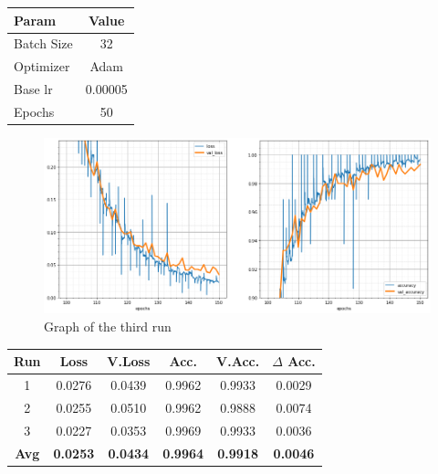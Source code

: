 \begin{table}[H]
	\centering
	\begin{tabular}{lc}
	\textbf{Param} & \textbf{Value}\\ \hline
	Batch Size 	& 32 \\
	Optimizer 	& Adam \\
	Base lr		& 0.00005 \\
	Epochs		& 50 \\
	\end{tabular}
\end{table}


\begin{figure}[H]
	\begin{center}
	\includegraphics[width=\linewidth]{Immagini/bn}
	\caption{Graph of the third run}
	\end{center}
\end{figure}
\begin{table}[H]
	\centering
	\begin{tabular}{cccccc}
		\textbf{Run} &\textbf{Loss}&\textbf{V.Loss} &\textbf{Acc.}&\textbf{V.Acc.}&\textbf{$\Delta$ Acc.} \\ \hline
	1   & 0.0276    & 0.0439    & 0.9962    & 0.9933    & 0.0029\\
	2   & 0.0255    & 0.0510    & 0.9962    & 0.9888    & 0.0074\\
	3   & 0.0227    & 0.0353    & 0.9969    & 0.9933    & 0.0036\\
	\textbf{Avg} & \textbf{0.0253}    & \textbf{0.0434}    & \textbf{0.9964}    & \textbf{0.9918}    & \textbf{0.0046}\\ 
	\end{tabular}
\end{table}




